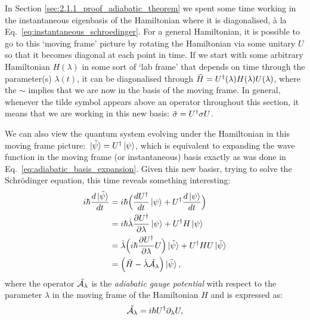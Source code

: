     In Section \ref{sec:2.1.1_proof_adiabatic_theorem} we spent some time working in the instantaneous eigenbasis of the Hamiltonian where it is diagonalised, à la Eq.~\eqref{eq:instantaneous_schroedinger}. For a general Hamiltonian, it is possible to go to this `moving frame' picture by rotating the Hamiltonian via some unitary $U$ so that it becomes diagonal at each point in time. If we start with some arbitrary Hamiltonian $H(\lambda)$ in some sort of `lab frame' that depends on time through the parameter(s) $\lambda(t)$, it can be diagonalised through $\Tilde{H} = U^{\dagger}(\lambda)H(\lambda)U(\lambda)$, where the $\sim$ implies that we are now in the basis of the moving frame. In general, whenever the tilde symbol appears above an operator throughout this section, it means that we are working in this new basis: $\Tilde{\sigma} = U^{\dagger}\sigma U$.

    We can also view the quantum system evolving under the Hamiltonian in this moving frame picture: $\ket*{\Tilde{\psi}} = U^{\dagger}\ket{\psi}$, which is equivalent to expanding the wave function in the moving frame (or instantaneous) basis exactly as was done in Eq.~\eqref{eq:adiabatic_basis_expansion}. Given this new basisr, trying to solve the Schr\"{o}dinger equation, this time reveals something interesting:
    \begin{equation}\label{eq:moving_frame_schrodinger}
        \begin{aligned}
            i \hbar \frac{d \ket*{\Tilde{\psi}}}{dt} &= i \hbar \Big( \frac{d U^{\dagger}}{dt}\ket*{\psi} + U^{\dagger} \frac{d \ket{\psi}}{dt} \Big) \\
            &= i \hbar \dot{\lambda} \frac{\partial U^{\dagger}}{\partial \lambda}\ket{\psi} + U^{\dagger} H\ket{\psi}\\
            &= \dot{\lambda} \Big(i\hbar \frac{\partial U^{\dagger}}{\partial \lambda}U \Big)\ket*{\Tilde{\psi}} + U^{\dagger} H U \ket*{\Tilde{\psi}} \\
            &= \Big(\Tilde{H} - \dot{\lambda}\Tilde{\mathcal{A}_{\lambda}}\Big) \ket*{\Tilde{\psi}},
        \end{aligned}
    \end{equation}
    where the operator $\Tilde{\mathcal{A}_{\lambda}}$ is the \emph{adiabatic gauge potential} with respect to the parameter $\lambda$ in the moving frame of the Hamiltonian $H$ and is expressed as:
    \begin{equation}\label{eq:AGP_in_terms_of_U}
        \Tilde{\mathcal{A}_{\lambda}} = i\hbar U^{\dagger}\partial_{\lambda} U,
    \end{equation}
    
